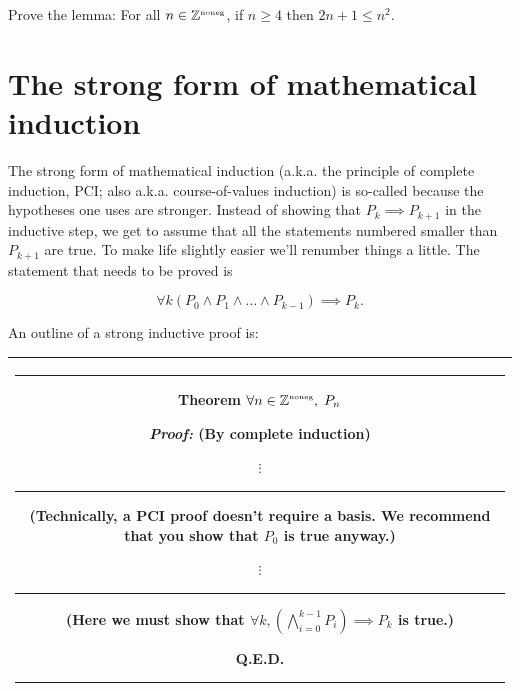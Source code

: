 \begin{exer} 
Prove the lemma:  For all $n \in {\mathbb Z}^{\mbox{\tiny noneg}}$, if $n \geq 4$ then
$2n+1 \leq n^2$.
\end{exer}

\newpage
  



\newpage
 
\section{The strong form of mathematical induction}
\label{sec:strong_induct}

The strong form of mathematical induction (a.k.a. the principle of
complete induction, PCI; also a.k.a. course-of-values induction) 
is so-called because the hypotheses one
uses are stronger.  Instead of showing that $P_k \implies P_{k+1}$ in
the inductive step, we get to assume that all the statements numbered
smaller than $P_{k+1}$ are true.  To make life slightly easier we'll
renumber things a little.  The statement that needs to be proved is

\[ \forall k (P_0 \land P_1 \land \ldots \land  P_{k-1}) \implies P_k. \]

 An outline of a strong inductive proof is:

\begin{center}
\begin{tabular}{|c|} \hline
\rule{16pt}{0pt}\begin{minipage}{.75\textwidth}

\rule{0pt}{16pt}{\bf \large Theorem} $ \displaystyle \forall n \in {\mathbb Z}^{\mbox{\tiny noneg}}, \; P_n $
\medskip

\rule{0pt}{20pt} {\em Proof:} (By complete induction)

\noindent {\bf Basis:}

\begin{center}
$\vdots$ \rule{36pt}{0pt} \begin{minipage}[c]{1.7 in} (Technically, a PCI %
proof doesn't require a basis.   We recommend that you show that $P_0$ %
is true anyway.) \end{minipage}
\end{center}

\noindent {\bf Inductive step:}

\begin{center}
$\vdots$ \rule{36pt}{0pt} \begin{minipage}[c]{1.7 in} (Here we must show that $\forall k,  \left( \bigwedge_{i=0}^{k-1} P_i \right) \implies P_{k}$ is true.) \end{minipage}
\end{center}

\rule{0pt}{0pt} \hspace{\fill} Q.E.D. \rule[-10pt]{0pt}{16pt}
\end{minipage} \rule{16pt}{0pt} \\ \hline
\end{tabular}
\end{center}
\medskip

